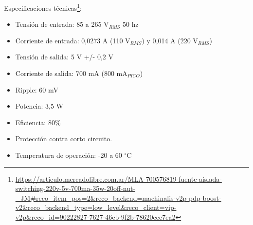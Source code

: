 Especificaciones técnicas\footnote{\url{https://articulo.mercadolibre.com.ar/MLA-700576819-fuente-aislada-switching-220v-5v-700ma-35w-20off-nut-_JM\#reco_item_pos=2&reco_backend=machinalis-v2p-pdp-boost-v2&reco_backend_type=low_level&reco_client=vip-v2p&reco_id=90222827-7627-46cb-9f2b-78620eec7ea2}}:
\begin{itemize}
\item Tensión de entrada: 85 a 265 V$_{RMS}$ 50 hz
\item Corriente de entrada: 0,0273 A (110 V$_{RMS}$) y 0,014 A (220 V$_{RMS}$)
\item Tensión de salida: 5 V +/- 0,2 V
\item Corriente de salida: 700 mA (800 mA$_{PICO}$)
\item Ripple: 60 mV
\item Potencia: 3,5 W
\item Eficiencia: 80\%
\item Protección contra corto circuito.
\item Temperatura de operación: -20 a 60 $^{\circ}$C 
\end{itemize}



